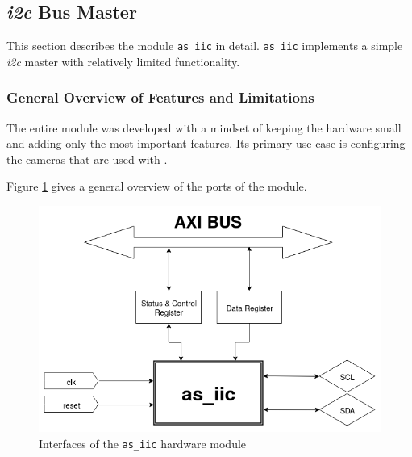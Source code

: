 






\subsection{\textit{i2c} Bus Master} 
\label{ch:07-05-modules-i2c}

This section describes the module \texttt{as\_iic} in detail.
\texttt{as\_iic} implements a simple \textit{i2c} master with relatively limited functionality.


\subsubsection{General Overview of Features and Limitations}

The entire module was developed with a mindset of keeping the hardware small and adding only the most important features. Its primary use-case is configuring the cameras that are used with \asterics.

Figure \ref{07-05-as-iic-overview} gives a general overview of the ports of the module. 

\begin{figure}[htbp]
\noindent \begin{centering}
\includegraphics[width=\textwidth]{figs/07-05-as-iic-module-overview}
\par\end{centering}
\caption{Interfaces of the \texttt{as\_iic} hardware module}
\label{07-05-as-iic-overview}
\end{figure}

